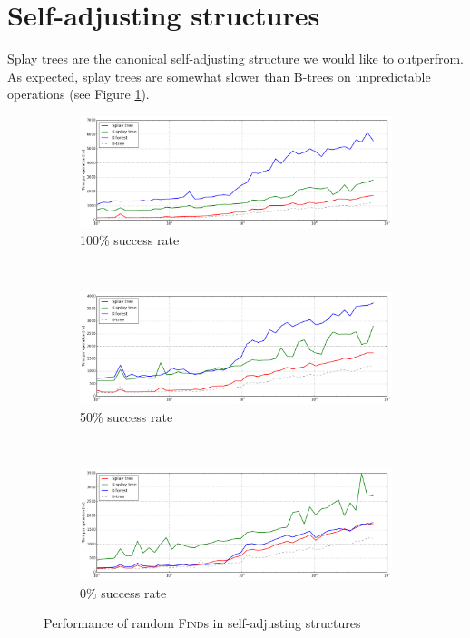 \section{Self-adjusting structures}
Splay trees are the canonical self-adjusting structure we would like to
outperfrom. As expected, splay trees are somewhat slower than B-trees on
unpredictable operations (see Figure \ref{fig:self-adj-performance-finds}).

\begin{figure}
\begin{subfigure}[t]{\textwidth}
	\includegraphics[width=\textwidth]{img/performance/self-adj-random-find-100}
	\caption{100\% success rate}
\end{subfigure}
\\
\begin{subfigure}[t]{\textwidth}
	\includegraphics[width=\textwidth]{img/performance/self-adj-random-find-50}
	\caption{50\% success rate}
\end{subfigure}
\\
\begin{subfigure}[t]{\textwidth}
	\includegraphics[width=\textwidth]{img/performance/self-adj-random-find-0}
	\caption{0\% success rate}
\end{subfigure}
\caption{Performance of random \textsc{Find}s in self-adjusting structures}
\label{fig:self-adj-performance-finds}
\end{figure}

